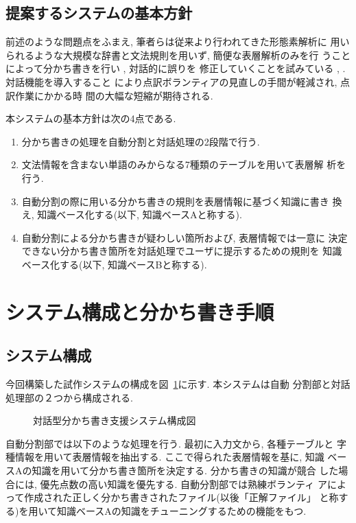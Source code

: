 \subsection{提案するシステムの基本方針}

前述のような問題点をふまえ, 筆者らは従来より行われてきた形態素解析に
用いられるような大規模な辞書と文法規則を用いず, 簡便な表層解析のみを行
うことによって分かち書きを行い \cite{Suzukietal1997a}, 対話的に誤りを
修正していくことを試みている
\cite{Suzukietal1997b}, \cite{Suzukietal1997c}. 対話機能を導入すること
により点訳ボランティアの見直しの手間が軽減され, 点訳作業にかかる時
間の大幅な短縮が期待される. 

本システムの基本方針は次の4点である. 


{\renewcommand{\labelitemi}{}
\begin{enumerate}
\item { 分かち書きの処理を自動分割と対話処理の2段階で行う. }
\item { 文法情報を含まない単語のみからなる7種類のテーブルを用いて表層解
      析を行う. }
\item { 自動分割の際に用いる分かち書きの規則を表層情報に基づく知識に書き
      換え, 知識ベース化する(以下, 知識ベースAと称する). }
\item { 自動分割による分かち書きが疑わしい箇所および, 表層情報では一意に
      決定できない分かち書き箇所を対話処理でユーザに提示するための規則を
      知識ベース化する(以下, 知識ベースBと称する). }
\end{enumerate}
}

\section{システム構成と分かち書き手順}
\subsection{システム構成}
今回構築した試作システムの構成を図~\ref{fig:c}に示す. 本システムは自動
分割部と対話処理部の２つから構成される. 

\begin{figure}[t]
\begin{center}
\caption{対話型分かち書き支援システム構成図}
\label{fig:c}
\end{center}
\end{figure}

自動分割部では以下のような処理を行う. 最初に入力文から, 各種テーブルと
字種情報を用いて表層情報を抽出する. ここで得られた表層情報を基に, 知識
ベースAの知識を用いて分かち書き箇所を決定する. 分かち書きの知識が競合
した場合には, 優先点数の高い知識を優先する. 自動分割部では熟練ボランティ
アによって作成された正しく分かち書きされたファイル(以後「正解ファイル」
と称する)を用いて知識ベースAの知識をチューニングするための機能をもつ. 


